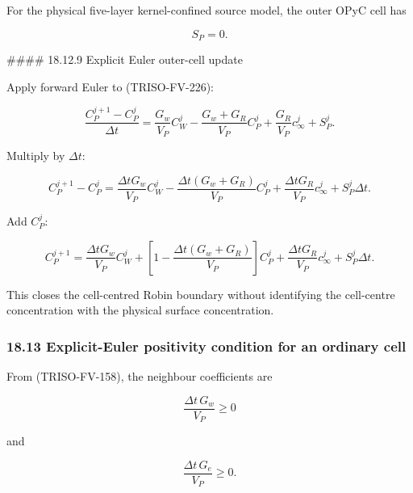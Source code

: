 \documentclass[11pt,a4paper]{article}
\begin{document}
For the physical five-layer kernel-confined source model, the outer OPyC cell has

\begin{equation}
S_P=0.
\tag{TRISO-FV-229}
\label{eq:triso-fv-229}
\end{equation}

\#\#\#\# 18.12.9 Explicit Euler outer-cell update

Apply forward Euler to (TRISO-FV-226):

\begin{equation}
\frac{
C_P^{j+1}-C_P^j
}{
\Delta t
}
=
\frac{G_w}{V_P}C_W^j
-
\frac{G_w+G_R}{V_P}C_P^j
+
\frac{G_R}{V_P}c_\infty^j
+
S_P^j.
\tag{TRISO-FV-230}
\label{eq:triso-fv-230}
\end{equation}

Multiply by $\Delta t$:

\begin{equation}
C_P^{j+1}-C_P^j
=
\frac{\Delta tG_w}{V_P}C_W^j
-
\frac{\Delta t(G_w+G_R)}{V_P}C_P^j
+
\frac{\Delta tG_R}{V_P}c_\infty^j
+
S_P^j\Delta t.
\tag{TRISO-FV-231}
\label{eq:triso-fv-231}
\end{equation}

Add $C_P^j$:

\begin{equation}
\boxed{
C_P^{j+1}
=
\frac{\Delta tG_w}{V_P}C_W^j
+
\left[
1-\frac{\Delta t(G_w+G_R)}{V_P}
\right]C_P^j
+
\frac{\Delta tG_R}{V_P}c_\infty^j
+
S_P^j\Delta t.
}
\tag{TRISO-FV-232}
\label{eq:triso-fv-232}
\end{equation}

This closes the cell-centred Robin boundary without identifying the cell-centre concentration with the physical surface concentration.

\subsubsection*{18.13 Explicit-Euler positivity condition for an ordinary cell}

From (TRISO-FV-158), the neighbour coefficients are

\begin{equation}
\frac{\Delta t\,G_w}{V_P}\ge0
\tag{TRISO-FV-600}
\label{eq:triso-fv-600}
\end{equation}

and

\begin{equation}
\frac{\Delta t\,G_e}{V_P}\ge0.
\tag{TRISO-FV-601}
\label{eq:triso-fv-601}
\end{equation}
\end{document}
